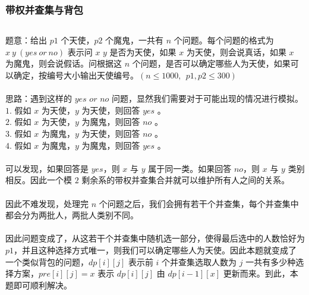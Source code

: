 \documentclass[twoside]{article}
\begin{document}
\subsubsection{带权并查集与背包}
\begin{lstlisting}
\end{lstlisting}
题意：给出 $p1$ 个天使，$p2$ 个魔鬼，一共有 $n$ 个问题。每个问题的格式为 $x\  y\  (yes\  or\  no)$ 表示问 $x$ $y$ 是否为天使，如果 $x$ 为天使，则会说真话，如果 $x$ 为魔鬼，则会说假话。问根据这 $n$ 个问题，是否可以确定哪些人为天使，如果可以确定，按编号大小输出天使编号。$(n\leq 1000,\ \ p1,p2\leq 300)$\\
\\
思路：遇到这样的 $yes$ $or$ $no$ 问题，显然我们需要对于可能出现的情况进行模拟。\\
$1.$ 假如 $x$ 为天使，$y$ 为天使，则回答 $yes$ 。\\
$2.$ 假如 $x$ 为天使，$y$ 为魔鬼，则回答 $no$ 。\\
$3.$ 假如 $x$ 为魔鬼，$y$ 为天使，则回答 $no$ 。\\
$4.$ 假如 $x$ 为魔鬼，$y$ 为魔鬼，则回答 $yes$ 。\\
\\
可以发现，如果回答是 $yes$，则 $x$ 与 $y$ 属于同一类。如果回答 $no$，则 $x$ 与 $y$ 类别相反。因此一个模 $2$ 剩余系的带权并查集合并就可以维护所有人之间的关系。\\
\\
因此不难发现，处理完 $n$ 个问题之后，我们会拥有若干个并查集，每个并查集中都会分为两批人，两批人类别不同。\\
\\
因此问题变成了，从这若干个并查集中随机选一部分，使得最后选中的人数恰好为 $p1$，并且这种选择方式唯一，则我们可以确定哪些人为天使。因此本题就变成了一个类似背包的问题，$dp[i][j]$ 表示前 $i$ 个并查集选取人数为 $j$ 一共有多少种选择方案，$pre[i][j]=x$ 表示 $dp[i][j]$ 由 $dp[i-1][x]$ 更新而来。到此，本题即可顺利解决。\\
\end{document}
